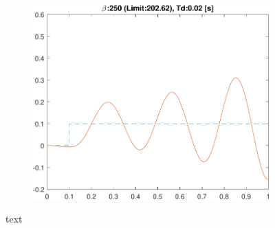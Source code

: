 \begin{figure}
\begin{subfigure}{0.33\linewidth}
	\includegraphics[width=0.95\linewidth]{../code/stretch/figs/result_gain_250_Td_0.02}
	\caption{}
\end{subfigure}\hfill
	\caption{text}
\end{figure}


